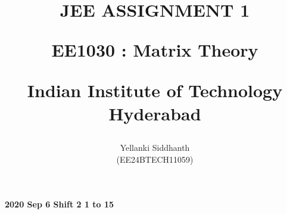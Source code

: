 \documentclass[journal]{IEEEtran}
\begin{document}

\onecolumn
\title{
JEE ASSIGNMENT 1

\large{EE1030 : Matrix Theory}

Indian Institute of Technology Hyderabad
}
\author{Yellanki Siddhanth

(EE24BTECH11059)
}	




\maketitle





\bigskip

\renewcommand{\thefigure}{\theenumi}
\renewcommand{\thetable}{\theenumi}
 
    
        \textbf{2020 Sep 6 Shift 2 1 to 15}
    
\end{document}
